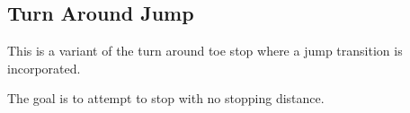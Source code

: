 \subsection*{Turn Around Jump}

This is a variant of the turn around toe stop where a jump transition is incorporated.

The goal is to attempt to stop with no stopping distance.
